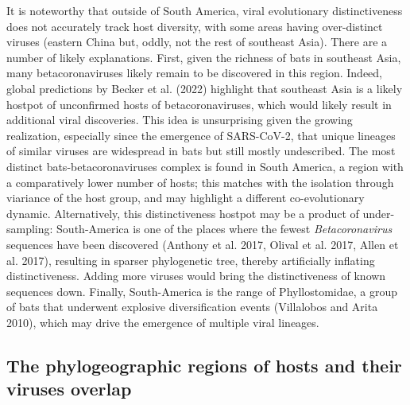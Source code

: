 \documentclass[11pt]{article}
\begin{document}
It is noteworthy that outside of South America, viral evolutionary
distinctiveness does not accurately track host diversity, with some
areas having over-distinct viruses (eastern China but, oddly, not the
rest of southeast Asia). There are a number of likely explanations.
First, given the richness of bats in southeast Asia, many
betacoronaviruses likely remain to be discovered in this region. Indeed,
global predictions by Becker et al. (2022) highlight that southeast Asia
is a likely hostpot of unconfirmed hosts of betacoronaviruses, which
would likely result in additional viral discoveries. This idea is
unsurprising given the growing realization, especially since the
emergence of SARS-CoV-2, that unique lineages of similar viruses are
widespread in bats but still mostly undescribed. The most distinct
bats-betacoronaviruses complex is found in South America, a region with
a comparatively lower number of hosts; this matches with the isolation
through viariance of the host group, and may highlight a different
co-evolutionary dynamic. Alternatively, this distinctiveness hostpot may
be a product of under-sampling: South-America is one of the places where
the fewest \emph{Betacoronavirus} sequences have been discovered
(Anthony et al. 2017, Olival et al. 2017, Allen et al. 2017), resulting
in sparser phylogenetic tree, thereby artificially inflating
distinctiveness. Adding more viruses would bring the distinctiveness of
known sequences down. Finally, South-America is the range of
Phyllostomidae, a group of bats that underwent explosive diversification
events (Villalobos and Arita 2010), which may drive the emergence of
multiple viral lineages.

\hypertarget{the-phylogeographic-regions-of-hosts-and-their-viruses-overlap}{%
\subsection{The phylogeographic regions of hosts and their viruses
overlap}\label{the-phylogeographic-regions-of-hosts-and-their-viruses-overlap}}
\end{document}
